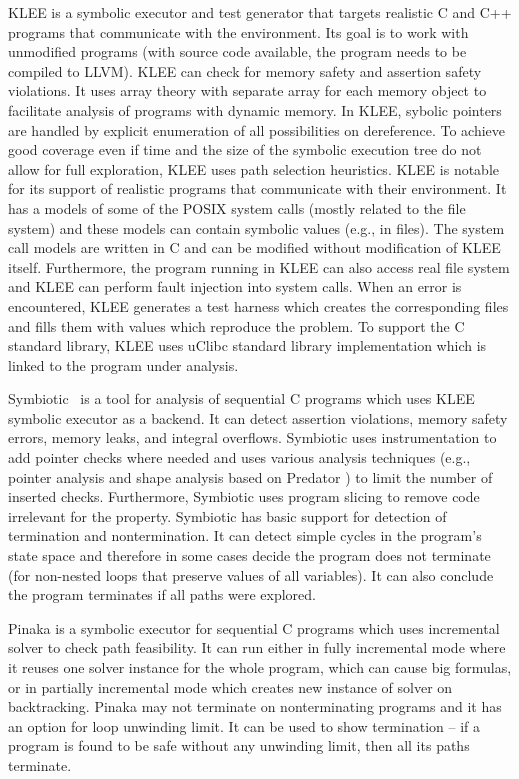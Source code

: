 KLEE  is a symbolic executor and test generator that targets realistic C and C++ programs that communicate with the environment.
Its goal is to work with unmodified programs (with source code available, the program needs to be compiled to LLVM).
KLEE can check for memory safety and assertion safety violations.
It uses array theory with separate array for each memory object to facilitate analysis of programs with dynamic memory.
In KLEE, sybolic pointers are handled by explicit enumeration of all possibilities on dereference.
To achieve good coverage even if time and the size of the symbolic execution tree do not allow for full exploration, KLEE uses path selection heuristics.
KLEE is notable for its support of realistic programs that communicate with their environment.
It has a models of some of the POSIX system calls (mostly related to the file system) and these models can contain symbolic values (e.g., in files).
The system call models are written in C and can be modified without modification of KLEE itself.
Furthermore, the program running in KLEE can also access real file system and KLEE can perform fault injection into system calls.
When an error is encountered, KLEE generates a test harness which creates the corresponding files and fills them with values which reproduce the problem.
To support the C standard library, KLEE uses uClibc standard library implementation which is linked to the program under analysis.

Symbiotic~ is a tool for analysis of sequential C programs which uses KLEE symbolic executor as a backend.
It can detect assertion violations, memory safety errors, memory leaks, and integral overflows.
Symbiotic uses instrumentation to add pointer checks where needed and uses various analysis techniques (e.g., pointer analysis and shape analysis based on Predator ) to limit the number of inserted checks.
Furthermore, Symbiotic uses program slicing to remove code irrelevant for the property.
Symbiotic has basic support for detection of termination and nontermination.
It can detect simple cycles in the program's state space and therefore in some cases decide the program does not terminate (for non-nested loops that preserve values of all variables).
It can also conclude the program terminates if all paths were explored.

Pinaka  is a symbolic executor for sequential C programs which uses incremental solver to check path feasibility.
It can run either in fully incremental mode where it reuses one solver instance for the whole program, which can cause big formulas, or in partially incremental mode which creates new instance of solver on backtracking.
Pinaka may not terminate on nonterminating programs and it has an option for loop unwinding limit.
It can be used to show termination -- if a program is found to be safe without any unwinding limit, then all its paths terminate.

